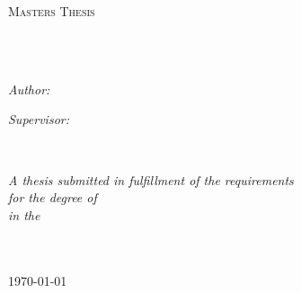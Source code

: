 \documentclass[
11pt, %
english, %
singlespacing, %
headsepline, %
]{MastersDoctoralThesis} %
\author{Jakob \textsc{Jenko}} %
\begin{document}
\frontmatter %

\pagestyle{plain} %


\begin{titlepage}
\begin{center}

\vspace*{.06\textheight}
{\scshape\LARGE \univname\par}\vspace{1.5cm} %
\textsc{\Large Masters Thesis}\\[0.5cm] %

\HRule \\[0.4cm] %
{\huge \bfseries \ttitle\par}\vspace{0.4cm} %
\HRule \\[1.5cm] %
 
\begin{minipage}[t]{0.4\textwidth}
\begin{flushleft} \large
\emph{Author:}\\
\href{http://www.johnsmith.com}{\authorname} %
\end{flushleft}
\end{minipage}
\begin{minipage}[t]{0.4\textwidth}
\begin{flushright} \large
\emph{Supervisor:} \\
\href{http://www.jamessmith.com}{\supname} %
\end{flushright}
\end{minipage}\\[3cm]
 
\vfill

\large \textit{A thesis submitted in fulfillment of the requirements\\ for the degree of \degreename}\\[0.3cm] %
\textit{in the}\\[0.4cm]
\groupname\\\deptname\\[2cm] %
 
\vfill

{\large \today}\\[4cm] %
 
\vfill
\end{center}
\end{titlepage}
\end{document}
